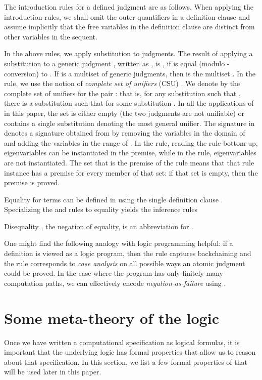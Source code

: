 \documentclass{acmtrans2m}
\begin{document}
The introduction rules for a defined judgment are as follows.
When applying the introduction rules, we shall omit the 
outer quantifiers in a definition clause 
and assume implicitly that the free variables in the definition
clause are distinct from other variables in the sequent.


In the above rules, we apply substitution to judgments.
The result of applying a substitution  to a generic judgment
, written as
, is
, if  is equal (modulo -conversion) to .  If  is a multiset of generic
judgments, then  is the multiset .  
In the  rule, we use the notion of {\em complete set of
unifiers} (CSU) \cite{huet75tcs}. We denote by  the
complete set of unifiers for the pair : that is, for
any substitution  such that , there
is a substitution  such that  for some substitution .  In all the
applications of  in this paper, the set  is
either empty (the two judgments are not unifiable) or contains a
single substitution denoting the most general unifier.  The signature
 in  denotes a signature obtained from 
by removing the variables in the domain of  and adding the
variables in the range of .  In the  rule, reading the
rule bottom-up, eigenvariables can be instantiated in the premise,
while in the  rule, eigenvariables are not instantiated.  The
set that is the premise of the  rule means that that rule
instance has a premise for every member of that set: if that set is
empty, then the premise is proved.

Equality for terms can be defined in  using the single
definition clause .
Specializing the  and  rules to equality yields the
inference rules

Disequality , the negation of equality, is an abbreviation
for .

One might find the following analogy with logic programming helpful:
if a definition is viewed as a logic program, then the  rule
captures backchaining and the  rule corresponds to {\em case
analysis} on all possible ways an atomic judgment could be proved.  In
the case where the program has only finitely many computation paths,
we can effectively encode {\em negation-as-failure} using 
\cite{hallnas91jlc}.


\section{Some meta-theory of the logic}
\label{sec:meta}

Once we have written a computational specification as logical
formulas, it is important that the underlying logic has 
formal properties that allow us to reason about that
specification.  In this section, we list a few formal properties of
 that will be used later in this paper.
\end{document}

